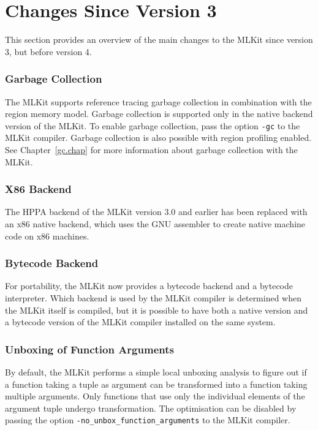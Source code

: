 \documentclass[12pt]{book}
\begin{document}
\section{Changes Since Version 3}
%
This section provides an overview of the main changes to the MLKit
since version 3, but before version 4.

\subsubsection*{Garbage Collection}
%
The MLKit supports reference tracing garbage collection in
combination with the region memory model. Garbage collection is
supported only in the native backend version of the MLKit. To enable
garbage collection, pass the option \texttt{-gc} to the MLKit compiler. Garbage
collection is also possible with region profiling enabled. See
Chapter~\ref{gc.chap} for more information about garbage collection
with the MLKit.

\subsubsection*{X86 Backend}
The 
%
HPPA backend of the MLKit version 3.0 and earlier has been replaced
with an
%
x86 native backend, which uses the GNU assembler to create native
machine code on x86 machines.

\subsubsection*{Bytecode Backend}
%
For portability, the MLKit now provides a bytecode backend and a
bytecode interpreter. Which backend is used by the MLKit compiler is
determined when the MLKit itself is compiled, but it is possible to have
both a native version and a bytecode version of the MLKit compiler
installed on the same system.

\subsubsection*{Unboxing of Function Arguments}
%
%
%
By default, the MLKit performs a simple local unboxing analysis to
figure out if a function taking a tuple as argument can be transformed
into a function taking multiple arguments. Only functions that use
only the individual elements of the argument tuple undergo
transformation. The optimisation can be disabled by passing the option
\texttt{-no\_unbox\_function\_arguments} to the MLKit compiler.
\end{document}
